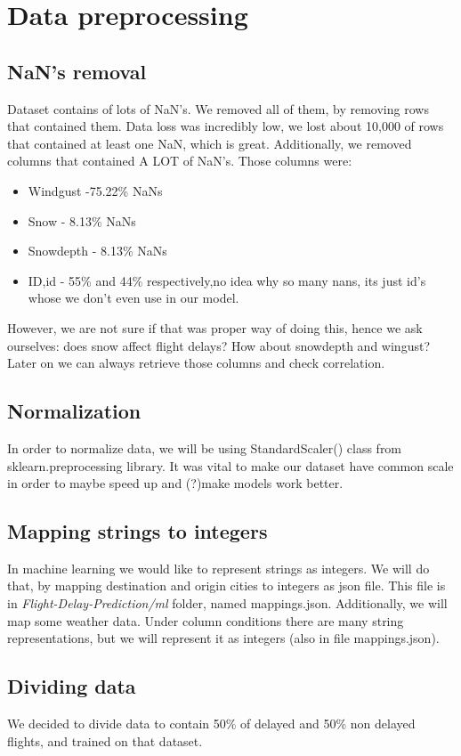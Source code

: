 \documentclass{article}
\begin{document}
\section{Data preprocessing}

\subsection{NaN's removal}
Dataset contains of lots of NaN's. We removed all of them, by removing rows that contained them. Data loss
was incredibly low, we lost about 10,000 of rows that contained at least one NaN, which is great. Additionally,
we removed columns that contained A LOT of NaN's. Those columns were:
	\begin{itemize}
		\item Windgust -75.22\% NaNs
		\item Snow - 8.13\% NaNs
		\item Snowdepth - 8.13\% NaNs
		\item ID,id - 55\% and 44\% respectively,no idea why so many nans, its just id's whose we don't even use in our model.
	\end{itemize}

However, we are not sure if that was proper way of doing this, hence we ask ourselves: does snow affect flight delays? How about snowdepth and wingust? Later on we can always retrieve those columns and check correlation.

\subsection{Normalization}
In order to normalize data, we will be using StandardScaler() class from sklearn.preprocessing library.
It was vital to make our dataset have common scale in order to maybe speed up and (?)make models work better.

\subsection{Mapping strings to integers}
In machine learning we would like to represent strings as integers. We will do that, by mapping destination and origin cities to integers
as json file. This file is in \textit{Flight-Delay-Prediction/ml} folder, named mappings.json. Additionally, we will map some weather data. Under column conditions there are many string representations, but we will represent it as integers (also in file mappings.json).

\subsection{Dividing data}
We decided to divide data to contain 50\% of delayed and 50\% non delayed flights, and trained on that dataset.
\end{document}
